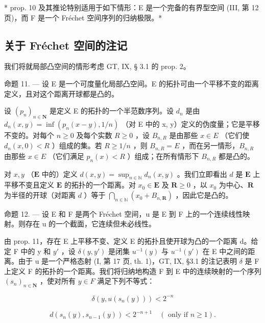 * prop. 10 及其推论特别适用于如下情形：E 是一个完备的有界型空间 (III, 第 12 页)，而 F 是一个 Fréchet 空间序列的归纳极限。*

\subsection{关于 Fréchet 空间的注记}

我们将就局部凸空间的情形考虑 GT, IX, § 3.1 的 prop. 2。

命题 11. --- 设 E 是一个可度量化局部凸空间。E 的拓扑可由一个平移不变的距离定义，且对这个距离开球都是凸的。

设 \((p_{n})_{n\in\mathbf{N}}\) 是定义 E 的拓扑的一个半范数序列。设 \(d_{n}\) 是由 \(d_{n}(x,y)=\inf(p_{n}(x-y),1/n)\) （对 E 中的 x, y）定义的伪度量；它是平移不变的。对每个 \(n\geqslant0\) 及每个实数 \(R\geqslant0\) ，设 \(B_{n,R}\) 是由那些 \(x\in E\) （它们使 \(d_{n}(x,0)<R\) ）组成的集。若 \(R\geqslant1/n\) ，则 \(B_{n,R}=E\) ，而在另一情形，\(B_{n,R}\) 由那些 \(x\in E\) （它们满足 \(p_{n}(x)<R\) ）组成；在所有情形下 \(B_{n,R}\) 都是凸的。

对 \(x, y\) （\(\mathbf{E}\) 中的）定义 \(d(x, y) = \sup_{n \in \mathbb{N}} d_n(x, y)\) 。我们立即看出 \(d\) 是 \(\mathbf{E}\) 上平移不变且定义 \(\mathbf{E}\) 的拓扑的一个距离。对 \(x_0 \in \mathbf{E}\) 及 \(\mathbf{R} \geqslant 0\) ，以 \(x_0\) 为中心、\(\mathbf{R}\) 为半径的开球（对距离 \(d\) ）等于 \(\bigcap_{n \in \mathbb{N}} (x_0 + B_{n,\mathbf{R}})\) ，因此它是凸的。

命题 12. --- 设 E 和 F 是两个 Fréchet 空间，u 是 E 到 F 上的一个连续线性映射。则存在 u 的一个截面，它连续但未必线性。

由 prop. 11，存在 E 上平移不变、定义 E 的拓扑且使开球为凸的一个距离 d。给定 F 中的 y 和 \(y'\) ，设 \(\delta(y, y')\) 是闭集 \(u^{-1}(y)\) 与 \(u^{-1}(y')\) 在 E 中之间的距离。由于 u 是一个严格态射 (I, 第 17 页, th. 1)，GT, IX, §3.1 的注记表明 \(\delta\) 是 F 上定义 F 的拓扑的一个距离。我们将归纳地构造 F 到 E 中的连续映射的一个序列 \((s_n)_{n \in \mathbf{N}}\) ，使对所有 \(y \in F\) 满足下列不等式：

\[
\delta (y, u (s _ {n} (y))) <   2 ^ {- n}\tag{2}
\]

\[
d \left(s _ {n} (y), s _ {n - 1} (y)\right) <   2 ^ {- n + 1} \quad (\text { only   if } n \geqslant 1).\tag{3}
\]

